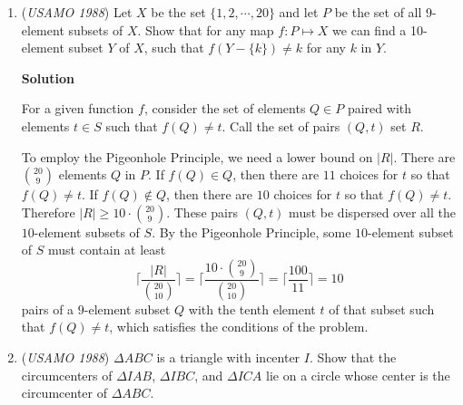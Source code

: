 \begin{enumerate}
 To show that $k \ge 0$, simply note that by the trivial inequality, all three squares are greater than $0$ as they are the squares of real numbers.

 To show that $\sqrt{k} \le r-t$, since both are positive, it is sufficient to show that $k \le (r-t)^2$. $\frac{(r-s)^2 + (s-t)^2 + (r-t)^2}{2} \le (r-t)^2$ implies that $k \le (r-t)^2$. $\frac{(r-s)^2 + (s-t)^2 - (r-t)^2}{2} \le 0$. Let $y = r-s$ and $z = s-t$. We then have $\frac{y^2 + z^2 - (y+z)^2}{2} \le 0 \implies -2yz \le 0$, which is clearly true as both $y$ and $z$ are positive.

 


	\item (\textit{USAMO 1988}) Let $X$ be the set $\{ 1, 2, \cdots , 20\}$ and let $P$ be the set of all 9-element subsets of $X$. Show that for any map $f: P\mapsto X$ we can find a 10-element subset $Y$ of $X$, such that $f(Y-\{k\})\neq k$ for any $k$ in $Y$.


 



\textbf{Solution}

For a given function $f$, consider the set of elements $Q \in P$ paired with elements $t \in S$ such that $f(Q) \ne t$. Call the set of pairs $(Q,t)$ set $R$.

 To employ the Pigeonhole Principle, we need a lower bound on $\lvert R \rvert$. There are $\binom{20}{9}$ elements $Q$ in $P$. If $f(Q) \in Q$, then there are $11$ choices for $t$ so that $f(Q) \ne t$. If $f(Q) \notin Q$, then there are $10$ choices for $t$ so that $f(Q) \ne t$. Therefore $\lvert R \rvert \ge 10 \cdot \binom{20}{9}$. These pairs $(Q,t)$ must be dispersed over all the $10$-element subsets of $S$. By the Pigeonhole Principle, some $10$-element subset of $S$ must contain at least 
 \[\lceil\frac{\lvert R \rvert}{\binom{20}{10}}\rceil = \lceil\frac{10\cdot\binom{20}{9}}{\binom{20}{10}}\rceil = \lceil\frac{100}{11}\rceil = 10\] pairs of a $9$-element subset $Q$ with the tenth element $t$ of that subset such that $f(Q) \ne t$, which satisfies the conditions of the problem.

 


	\item (\textit{USAMO 1988}) $\Delta ABC$ is a triangle with incenter $I$. Show that the circumcenters of $\Delta IAB$, $\Delta IBC$, and $\Delta ICA$ lie on a circle whose center is the circumcenter of $\Delta ABC$.


 




\end{enumerate}
